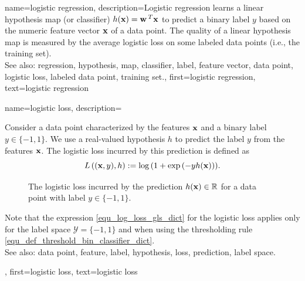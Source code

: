 {
{name={logistic regression}, 
	description={Logistic regression learns a 
		linear hypothesis map (or classifier) $h({\bf x}) = {\bf w}\,^{T} {\bf x}$ 
		to predict a binary label $y$ based on the numeric feature vector ${\bf x}$ of 
		a data point. The quality of a linear hypothesis map is measured by the average logistic loss 
		on some labeled data points (i.e., the training set).
				\\
		See also: regression, hypothesis, map, classifier, label, feature vector, data point, logistic loss, labeled data point, training set.},
	first={logistic regression},
	text={logistic regression}
}
	
{name={logistic loss}, 
	description={Consider 
		a data point characterized by the features ${\bf x}$ and a binary label $y \in \{-1,1\}$. 
		We use a real-valued hypothesis $h$ to predict the label $y$ 
		from the features ${\bf x}$. The logistic loss incurred by this prediction is 
		defined as 
	\begin{equation} 
		\label{equ_log_loss_gls_dict}
		L\left(({\bf x},y),h \right) :=  \log\, ( 1 + \exp\,(- y h({\bf x}))).
	\end{equation}
	\begin{figure}[H]
	\begin{center}
		\caption{The logistic loss incurred by the prediction $h({\bf x}) \in \mathbb{R}$ 
			for a data point with label $y \in \{-1,1\}$.}
		\label{fig_logloss_dict}
	\end{center}
	\end{figure}
	Note that the expression \eqref{equ_log_loss_gls_dict} 
	for the logistic loss applies only for the label space $\mathcal{Y} = \{ -1,1\}$ and when using 
	the thresholding rule \eqref{equ_def_threshold_bin_classifier_dict}. 
		\\
		See also: data point, feature, label, hypothesis, loss, prediction, label space.},
	first={logistic loss},
	text={logistic loss}
}
	
}
